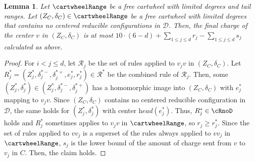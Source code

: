 \documentclass[10pt,a4paper]{article}
\newtheorem{lem}[thm]{Lemma}
\def\head{\textit{head}}
\begin{document}
\begin{lem}
\label{lem:estimate_charge_easy}
    Let $\cartwheelRange$ be a free cartwheel with limited degrees and tail ranges.
    Let $(Z_C, \delta_C) \in \cartwheelRange$ be a free cartwheel with limited degrees that contains no centered reducible configurations in $\mathcal{D}$.
    Then, the final charge of the center $v$ in $(Z_C, \delta_C)$ is at most $10 \cdot (6-d) + \sum_{1 \leq j \leq d} r_j - \sum_{1 \leq j \leq d} s_j$ calculated as above.
\end{lem}
\begin{proof}
    For $i < j \leq d$, let $\mathcal{R}_j$ be the set of rules applied to $v_jv$ in $(Z_C, \delta_C)$.
    Let $R^*_j = (Z^*_j, \delta_j^{*-}, \delta_j^{*+}, e_j^*, r_j^*) \in \mathcal{R}^*$ be the combined rule of $\mathcal{R}_j$.
    Then, some $(Z^*_j, \delta_j^*) \in (Z^*_j, \delta_j^{*-}, \delta_j^{*+})$ has a homomorphic image into $(Z_C, \delta_C)$ with $e_j^*$ mapping to $v_jv$.
    Since $(Z_C, \delta_C)$ contains no centered reducible configuration in $\mathcal{D}$, the same holds for $(Z^*_j, \delta_j^*)$ with center $\head(e_j^*)$.
    Thus, $R^*_j \in \cRnoD$ holds and $R^*_j$ sometimes applies to $v_jv$ in $\cartwheelRange$, so $r_j \geq r^*_j$.
    Since the set of rules applied to $vv_j$ is a superset of the rules always applied to $vv_j$ in $\cartwheelRange$, $s_j$ is the lower bound of the amount of charge sent from $v$ to $v_j$ in $C$.
    Then, the claim holds.
\end{proof}
\end{document}
